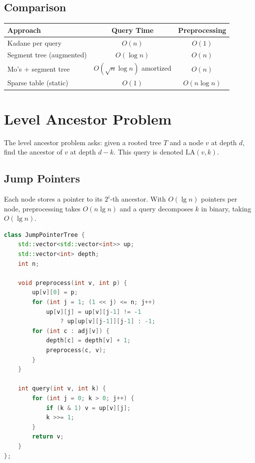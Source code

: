 \subsection{Comparison}

\begin{center}
\begin{tabular}{lcc}
\toprule
Approach & Query Time & Preprocessing \\
\midrule
Kadane per query & $O(n)$ & $O(1)$ \\
Segment tree (augmented) & $O(\log n)$ & $O(n)$ \\
Mo's + segment tree & $O(\sqrt{n}\log n)$ amortized & $O(n)$ \\
Sparse table (static) & $O(1)$ & $O(n \log n)$ \\
\bottomrule
\end{tabular}
\end{center}

\section{Level Ancestor Problem}
\label{sec:level-ancestor}

The level ancestor problem asks: given a rooted tree $T$ and a node $v$ at depth $d$, find the ancestor of $v$ at depth $d - k$. This query is denoted $\text{LA}(v, k)$.

\subsection{Jump Pointers}

Each node stores a pointer to its $2^i$-th ancestor. With $O(\lg n)$ pointers per node, preprocessing takes $O(n \lg n)$ and a query decomposes $k$ in binary, taking $O(\lg n)$.

\begin{lstlisting}[language=C++]
class JumpPointerTree {
    std::vector<std::vector<int>> up;
    std::vector<int> depth;
    int n;

    void preprocess(int v, int p) {
        up[v][0] = p;
        for (int j = 1; (1 << j) <= n; j++)
            up[v][j] = up[v][j-1] != -1
                ? up[up[v][j-1]][j-1] : -1;
        for (int c : adj[v]) {
            depth[c] = depth[v] + 1;
            preprocess(c, v);
        }
    }

    int query(int v, int k) {
        for (int j = 0; k > 0; j++) {
            if (k & 1) v = up[v][j];
            k >>= 1;
        }
        return v;
    }
};
\end{lstlisting}

